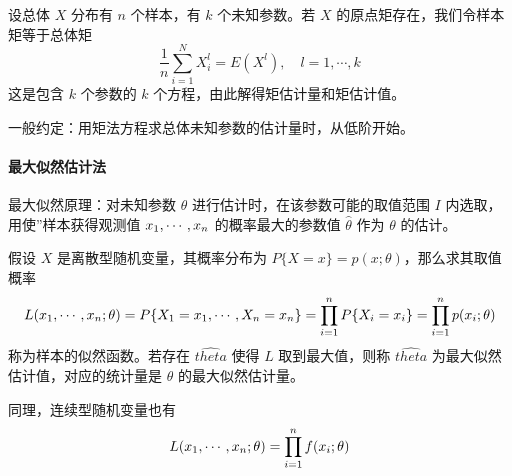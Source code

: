 设总体 $X$ 分布有 $n$ 个样本，有 $k$ 个未知参数。若 $X$ 的原点矩存在，我们令样本矩等于总体矩
\[ \frac{1}{n} \sum_{i=1}^{N} X_i^l = E(X^l), \quad l = 1, \cdots, k \]
这是包含 $k$ 个参数的 $k$ 个方程，由此解得矩估计量和矩估计值。

一般约定：用矩法方程求总体未知参数的估计量时，从低阶开始。

\paragraph{最大似然估计法}

最大似然原理：对未知参数 $\theta$ 进行估计时，在该参数可能的取值范围 $I$ 内选取，用使”样本获得观测值 $x_1,\cdots,x_n$ 的概率最大的参数值 $\hat{\theta}$ 作为 $\theta$ 的估计。

假设 $X$ 是离散型随机变量，其概率分布为 $P\{X = x\} = p(x; \theta)$，那么求其取值概率
\[ L(x_1,\cdots,x_n;\theta) = P\{X_1 = x_1, \cdots, X_n = x_n\} = \prod_{i=1}^n P\{X_i=x_i\} = \prod_{i=1}^n p(x_i; \theta) \]
称为样本的似然函数。若存在 $\hat{theta}$ 使得 $L$ 取到最大值，则称 $\hat{theta}$ 为最大似然估计值，对应的统计量是 $\theta$ 的最大似然估计量。

同理，连续型随机变量也有
\[ L(x_1,\cdots,x_n; \theta) = \prod_{i=1}^n f(x_i; \theta) \]



